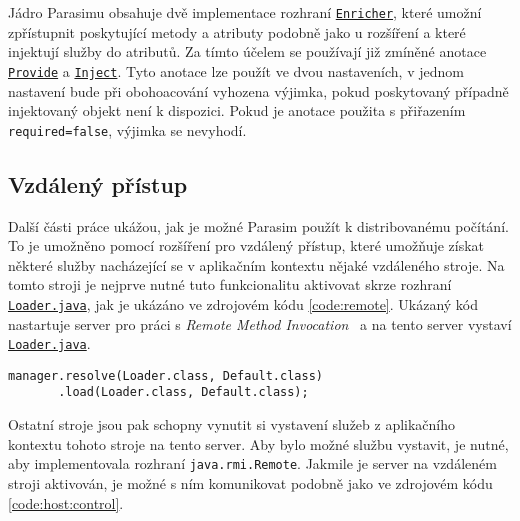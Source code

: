 Jádro Parasimu obsahuje dvě implementace rozhraní \href{https://github.com/sybila/parasim/blob/master/core/src/main/java/org/sybila/parasim/core/spi/enrichment/Enricher.java}{\texttt{Enricher}},
které umožní zpřístupnit poskytující metody a atributy podobně jako u rozšíření 
a které injektují služby do atributů. Za tímto účelem se používají již zmíněné anotace \href{https://github.com/sybila/parasim/blob/master/core/src/main/java/org/sybila/parasim/core/annotation/Provide.java}{\texttt{Provide}} a \href{https://github.com/sybila/parasim/blob/master/core/src/main/java/org/sybila/parasim/core/annotation/Inject.java}{\texttt{Inject}}.
Tyto anotace lze použít ve dvou nastaveních, v jednom nastavení bude při obohoacování
vyhozena výjimka, pokud poskytovaný případně injektovaný objekt není k dispozici.
Pokud je anotace použita s přiřazením \texttt{required=false}, výjimka se nevyhodí.

\subsection{Vzdálený přístup}\label{section:remote}

Další části práce ukážou, jak je možné Parasim použít k distribovanému počítání.
To je umožněno pomocí rozšíření pro vzdálený přístup, které u\-mož\-ňu\-je získat
některé služby nacházející se v aplikačním kontextu nějaké vzdáleného stroje.
Na tomto stroji je nejprve nutné tuto funkcionalitu aktivovat skrze rozhraní \href{https://github.com/sybila/parasim/blob/master/core/src/main/java/org/sybila/parasim/core/api/remote/Loader.java}{\texttt{Loader.java}},
jak je ukázáno ve zdrojovém kódu \ref{code:remote}. Ukázaný kód nastartuje server
pro práci s \textit{Remote Method Invocation}~\cite{grosso2001} a na tento server vystaví \href{https://github.com/sybila/parasim/blob/master/core/src/main/java/org/sybila/parasim/core/api/remote/Loader.java}{\texttt{Loader.java}}.

\begin{lstlisting}[label={code:remote}, caption={Spuštění serveru}]
manager.resolve(Loader.class, Default.class)
	   .load(Loader.class, Default.class);
\end{lstlisting}
Ostatní stroje jsou pak schopny vynutit si vystavení služeb z aplikačního kontextu
tohoto stroje na tento server. Aby bylo možné službu vystavit, je nutné, aby implementovala
rozhraní \texttt{java.rmi.Remote}. Jakmile je server na vzdáleném stroji aktivován,
je možné s ním komunikovat podobně jako ve zdrojovém kódu \ref{code:host:control}.

